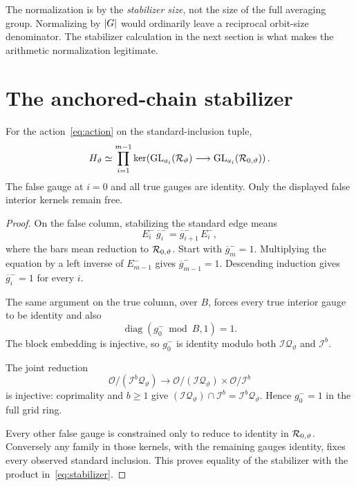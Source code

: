 The normalization is by the \emph{stabilizer size}, not the size of the full averaging group. Normalizing by $\lvert G\rvert$ would ordinarily leave a reciprocal orbit-size denominator. The stabilizer calculation in the next section is what makes the arithmetic normalization legitimate.

\section{The anchored-chain stabilizer}
\label{sec:stabilizer}

\begin{theorem}\label{thm:stabilizer}
For the action~\eqref{eq:action} on the standard-inclusion tuple,
\begin{equation}\label{eq:stabilizer}
 H_\vartheta\simeq
 \prod_{i=1}^{m-1}
 \ker\!\left(\operatorname{GL}_{a_i}(\mathcal R_\vartheta)
       \longrightarrow\operatorname{GL}_{a_i}(\mathcal R_{0,\vartheta})\right).
\end{equation}
The false gauge at $i=0$ and all true gauges are identity. Only the displayed false interior kernels remain free.
\end{theorem}
\begin{proof}
On the false column, stabilizing the standard edge means
\[
 E_i^-\,\overline g_i^-=\overline g_{i+1}^-\,E_i^-,
\]
where the bars mean reduction to $\mathcal R_{0,\vartheta}$. Start with $\overline g_m^-=1$. Multiplying the equation by a left inverse of $E_{m-1}^-$ gives $\overline g_{m-1}^-=1$. Descending induction gives $\overline g_i^-=1$ for every $i$.

The same argument on the true column, over $B$, forces every true interior gauge to be identity and also
\[
 \operatorname{diag}(g_0^-\bmod B,1)=1.
\]
The block embedding is injective, so $g_0^-$ is identity modulo both $\mathcal I\mathcal Q_\vartheta$ and $\mathcal I^b$.

The joint reduction
\begin{equation}\label{eq:jointreduction}
 \mathcal O/(\mathcal I^b\mathcal Q_\vartheta)
 \longrightarrow
 \mathcal O/(\mathcal I\mathcal Q_\vartheta)\times\mathcal O/\mathcal I^b
\end{equation}
is injective: coprimality and $b\geq1$ give
$(\mathcal I\mathcal Q_\vartheta)\cap\mathcal I^b
=\mathcal I^b\mathcal Q_\vartheta$. Hence $g_0^-=1$ in the full grid ring.

Every other false gauge is constrained only to reduce to identity in $\mathcal R_{0,\vartheta}$. Conversely any family in those kernels, with the remaining gauges identity, fixes every observed standard inclusion. This proves equality of the stabilizer with the product in~\eqref{eq:stabilizer}.
\end{proof}

